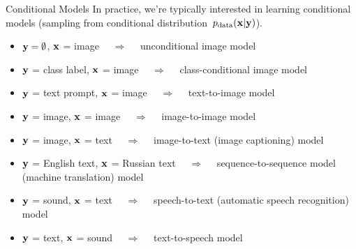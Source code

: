 \documentclass{beamer}
\begin{document}
\begin{frame}{ Conditional Models}
	In practice, we're typically interested in learning conditional models (sampling from conditional distribution~$p_{\text{data}}(\mathbf{x} | \mathbf{y})$). 
	\eqpause
	\begin{itemize}
		\item $\mathbf{y} = \emptyset$, $\mathbf{x}$ = image $\quad\Rightarrow\quad$ unconditional image model
		\item $\mathbf{y}$ = class label, $\mathbf{x}$ = image $\quad\Rightarrow\quad$ class-conditional image model
		\item $\mathbf{y}$ = text prompt, $\mathbf{x}$ = image $\quad\Rightarrow\quad$ text-to-image model
		\item $\mathbf{y}$ = image, $\mathbf{x}$ = image $\quad\Rightarrow\quad$ image-to-image model
		\item $\mathbf{y}$ = image, $\mathbf{x}$ = text $\quad\Rightarrow\quad$ image-to-text (image captioning) model
		\item $\mathbf{y}$ = English text, $\mathbf{x}$ = Russian text $\quad\Rightarrow\quad$ sequence-to-sequence model (machine translation) model
		\item $\mathbf{y}$ = sound, $\mathbf{x}$ = text $\quad\Rightarrow\quad$ speech-to-text (automatic speech recognition) model
		\item $\mathbf{y}$ = text, $\mathbf{x}$ = sound $\quad\Rightarrow\quad$ text-to-speech model
	\end{itemize}
\end{frame}
\end{document}
